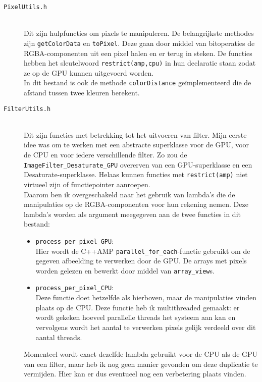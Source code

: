 \documentclass[12pt]{article}
\begin{document}
\begin{description}
    \item [\tt PixelUtils.h]\hfill \\ 
        Dit zijn hulpfuncties om pixels te manipuleren.
        De belangrijkste methodes zijn {\tt getColorData} en {\tt toPixel}.
        Deze gaan door middel van bitoperaties de RGBA-componenten uit een pixel halen en er terug in steken.
        De functies hebben het sleutelwoord {\tt restrict(amp,cpu)} in hun declaratie staan zodat ze op de GPU kunnen uitgevoerd worden.\\
        In dit bestand is ook de methode {\tt colorDistance} geïmplementeerd die de afstand tussen twee kleuren berekent.
    \item [\tt FilterUtils.h]\hfill \\
        Dit zijn functies met betrekking tot het uitvoeren van filter.
Mijn eerste idee was om te werken met een abstracte superklasse voor de GPU, voor de CPU en voor iedere verschillende filter.
Zo zou de {\tt ImageFilter\_Desaturate\_GPU} overerven van een GPU-superklasse en een Desaturate-superklasse.
Helaas kunnen functies met {\tt restrict(amp)} niet virtueel zijn of functiepointer aanroepen.\\ Daarom ben ik overgeschakeld naar het gebruik van lambda's die de manipulaties op de RGBA-componenten voor hun rekening nemen.
Deze lambda's worden als argument meegegeven aan de twee functies in dit bestand:
        \begin{itemize}
            \item{\tt process\_per\_pixel\_GPU}:\\ Hier wordt de C++AMP {\tt parallel\_for\_each}-functie gebruikt om de gegeven afbeelding te verwerken door de GPU.
De arrays met pixels worden gelezen en bewerkt door middel van {\tt array\_view}s.
            \item{\tt process\_per\_pixel\_CPU}:\\ Deze functie doet hetzelfde als hierboven, maar de manipulaties vinden plaats op de CPU.
Deze functie heb ik multithreaded gemaakt: er wordt gekeken hoeveel parallelle threads het systeem aan kan en vervolgens wordt het aantal te verwerken pixels gelijk verdeeld over dit aantal threads.
        \end{itemize}
        Momenteel wordt exact dezelfde lambda gebruikt voor de CPU als de GPU van een filter, maar heb ik nog geen manier gevonden om deze duplicatie te vermijden.
Hier kan er dus eventueel nog een verbetering plaats vinden.
\end{description}
\end{document}
